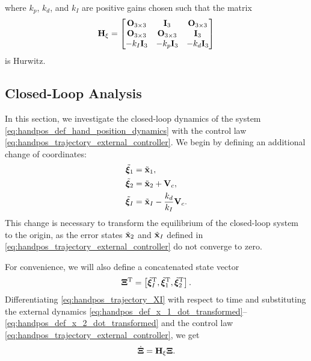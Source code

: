 \noindent where $k_p$, $k_d$, and $k_I$ are positive gains chosen such that the matrix
\begin{equation}
    \mathbf{H}_{\xi}
    =
    \begin{bmatrix}
        \mathbf{O}_{3 \times 3} & \mathbf{I}_{3} & \mathbf{O}_{3 \times 3} \\ \mathbf{O}_{3 \times 3} & \mathbf{O}_{3 \times 3} & \mathbf{I}_{3} \\ -k_I \mathbf{I}_{3} & -k_p \mathbf{I}_{3} & -k_d \mathbf{I}_{3}
    \end{bmatrix} \label{eq:handpos_trajectory_H_xi}
\end{equation}
is Hurwitz.

\subsection{Closed-Loop Analysis}
In this section, we investigate the closed-loop dynamics of the system \eqref{eq:handpos_def_hand_position_dynamics} with the control law \eqref{eq:handpos_trajectory_external_controller}.
We begin by defining an additional change of coordinates:
\begin{subequations}
    \begin{align}
        \tilde{\bm{\xi}}_1 &= \tilde{\mathbf{x}}_1, \\
        \tilde{\bm{\xi}}_2 &= \tilde{\mathbf{x}}_2 + \mathbf{V}_c, \\
        \tilde{\bm{\xi}}_I &= \tilde{\mathbf{x}}_I - \frac{k_d}{k_I}\mathbf{V}_c.
    \end{align} \label{eq:handpos_trajectory_hand_transform_CL}
\end{subequations}
This change is necessary to transform the equilibrium of the closed-loop system to the origin, as the error states $\tilde{\mathbf{x}}_2$ and $\tilde{\mathbf{x}}_I$ defined in \eqref{eq:handpos_trajectory_external_controller} do not converge to zero.

For convenience, we will also define a concatenated state vector
\begin{equation}
    \bm{\Xi}^{\mathrm{T}} = \left[{\tilde{\bm{\xi}}}_I^{\mathrm{T}}, {\tilde{\bm{\xi}}}_1^{\mathrm{T}}, {\tilde{\bm{\xi}}}_2^{\mathrm{T}}\right].
    \label{eq:handpos_trajectory_XI}
\end{equation}
Differentiating \eqref{eq:handpos_trajectory_XI} with respect to time and substituting the external dynamics \eqref{eq:handpos_def_x_1_dot_transformed}--\eqref{eq:handpos_def_x_2_dot_transformed} and the control law \eqref{eq:handpos_trajectory_external_controller}, we get
\begin{equation}
    \dot{\bm{\Xi}} = \mathbf{H}_{\xi} \bm{\Xi}. \label{eq:handpos_trajectory_external_dynamics}
\end{equation}

